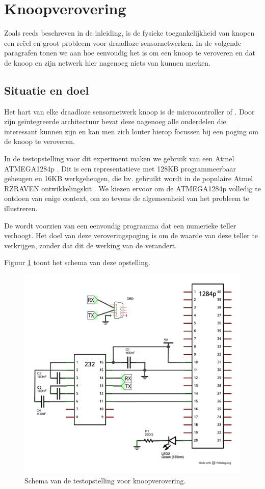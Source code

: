 
\section{Knoopverovering}

Zoals reeds beschreven in de inleiding, is de fysieke toegankelijkheid van
knopen een re\"eel en groot probleem voor draadloze sensornetwerken. In de
volgende paragrafen tonen we aan hoe eenvoudig het is om een knoop te veroveren
en dat de knoop en zijn netwerk hier nagenoeg niets van kunnen merken.

\subsection{Situatie en doel}

Het hart van elke draadloze sensornetwerk knoop is de microcontroller of \mcu.
Door zijn ge\"integreerde architectuur bevat deze nagenoeg alle onderdelen die
interessant kunnen zijn en kan men zich louter hierop focussen bij een poging
om de knoop te veroveren.

In de testopstelling voor dit experiment maken we gebruik van een Atmel
ATMEGA1284p \cite{datasheet:atmega1284p}. Dit is een representatieve \mcu met
128KB programmeerbaar geheugen en 16KB werkgeheugen, die bv. gebruikt wordt in
de populaire Atmel RZRAVEN ontwikkelingskit \cite{manual:rzraven}. We kiezen
ervoor om de ATMEGA1284p volledig te ontdoen van enige context, om zo tevens de
algemeenheid van het probleem te illustreren.

De \mcu wordt voorzien van een eenvoudig programma dat een numerieke teller
verhoogt. Het doel van deze veroveringspoging is om de waarde van deze teller
te verkrijgen, zonder dat dit de werking van de \mcu verandert.

Figuur \ref{fig:node-capture-schematic} toont het schema van deze opstelling.

\begin{figure}[hb]
  \centering
  \includegraphics[width=0.7\linewidth]{resources/node-capture-schematic.pdf}
  \caption{Schema van de testopstelling voor knoopverovering.}
  \label{fig:node-capture-schematic}
\end{figure}

